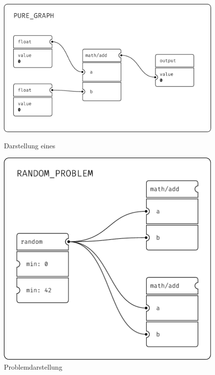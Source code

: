 \documentclass[ngerman]{article}
\begin{document}
\begin{figure}[htbp]
    \centering
    \begin{minipage}[b]{0.45\textwidth}
        \centering
        \includegraphics[width=\textwidth]{graphics/PURE_GRAPH.pdf}
        \caption{Darstellung eines }
        \label{sec:PURE_GRAPH}
    \end{minipage}
    \hfill
    \begin{minipage}[b]{0.45\textwidth}
        \centering
        \includegraphics[width=\textwidth]{graphics/RANDOM_PROBLEM.pdf}
        \caption{Problemdarstellung}
        \label{fig:problem}
    \end{minipage}
\end{figure}
\end{document}
